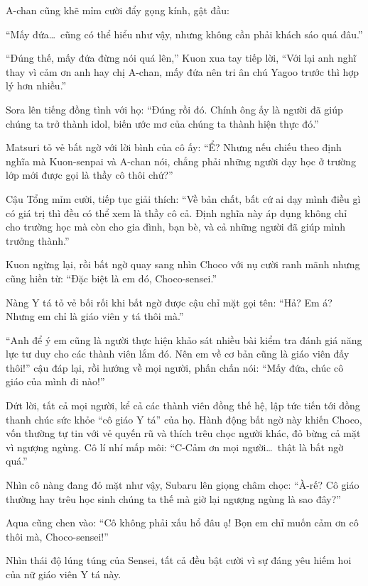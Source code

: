 \documentclass[../main.tex]{subfiles}
\begin{document}
A-chan cũng khẽ mỉm cười đẩy gọng kính, gật đầu:

``Mấy đứa\dots\ cũng có thể hiểu như vậy, nhưng không cần phải khách sáo quá đâu.''

``Đúng thế, mấy đứa đừng nói quá lên,'' Kuon xua tay tiếp lời, ``Với lại anh nghĩ thay vì cảm ơn anh hay chị A-chan, mấy đứa nên tri ân chú Yagoo trước thì hợp lý hơn nhiều.''

Sora lên tiếng đồng tình với họ: ``Đúng rồi đó. Chính ông ấy là người đã giúp chúng ta trở thành idol, biến ước mơ của chúng ta thành hiện thực đó.''

Matsuri tỏ vẻ bất ngờ với lời bình của cô ấy: ``Ể? Nhưng nếu chiếu theo định nghĩa mà Kuon-senpai và A-chan nói, chẳng phải những người dạy học ở trường lớp mới được gọi là thầy cô thôi chứ?''

Cậu Tổng mỉm cười, tiếp tục giải thích: ``Về bản chất, bất cứ ai dạy mình điều gì có giá trị thì đều có thể xem là thầy cô cả. Định nghĩa này áp dụng không chỉ cho trường học mà còn cho gia đình, bạn bè, và cả những người đã giúp mình trưởng thành.''

Kuon ngừng lại, rồi bất ngờ quay sang nhìn Choco với nụ cười ranh mãnh nhưng cũng hiền từ: ``Đặc biệt là em đó, Choco-sensei.''

Nàng Y tá tỏ vẻ bối rối khi bất ngờ được cậu chỉ mặt gọi tên: ``Hả? Em á? Nhưng em chỉ là giáo viên y tá thôi mà.''

``Anh để ý em cũng là người thực hiện khảo sát nhiều bài kiểm tra đánh giá năng lực tư duy cho các thành viên lắm đó. Nên em về cơ bản cũng là giáo viên đấy thôi!'' cậu đáp lại, rồi hướng về mọi người, phấn chấn nói: ``Mấy đứa, chúc cô giáo của mình đi nào!''

Dứt lời, tất cả mọi người, kể cả các thành viên đồng thế hệ, lập tức tiến tới đồng thanh chúc sức khỏe ``cô giáo Y tá'' của họ. Hành động bất ngờ này khiến Choco, vốn thường tự tin với vẻ quyến rũ và thích trêu chọc người khác, đỏ bừng cả mặt vì ngượng ngùng. Cô lí nhí mấp môi: ``C-Cảm ơn mọi người\dots\ thật là bất ngờ quá.''

Nhìn cô nàng đang đỏ mặt như vậy, Subaru lên giọng châm chọc: ``À-rế? Cô giáo thường hay trêu học sinh chúng ta thế mà giờ lại ngượng ngùng là sao đây?''

Aqua cũng chen vào: ``Cô không phải xấu hổ đâu ạ! Bọn em chỉ muốn cảm ơn cô thôi mà, Choco-sensei!''

Nhìn thái độ lúng túng của Sensei, tất cả đều bật cười vì sự đáng yêu hiếm hoi của nữ giáo viên Y tá này.
\end{document}
